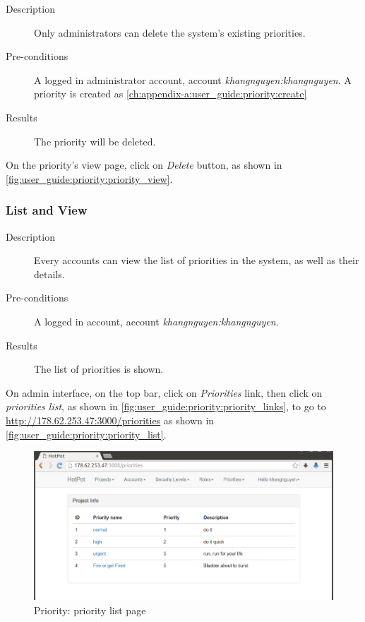 \begin{description}
\item[Description] Only administrators can delete the system's existing priorities.
\item[Pre-conditions] A logged in administrator account, \eg account \emph{khangnguyen:khangnguyen}.
A priority is created as \autoref{ch:appendix-a:user_guide:priority:create}
\item[Results] The priority will be deleted.
\end{description}

On the priority's view page, click on \emph{Delete} button, as shown in \autoref{fig:user_guide:priority:priority_view}.

\subsubsection{List and View}
\label{ch:appendix-a:user_guide:priority:list}

\begin{description}
\item[Description] Every accounts can view the list of priorities in the system, as well as their details.
\item[Pre-conditions] A logged in account, \eg account \emph{khangnguyen:khangnguyen}.
\item[Results] The list of priorities is shown.
\end{description}

On admin interface, on the top bar, click on \emph{Priorities} link, then click on \emph{priorities list}, as shown in \autoref{fig:user_guide:priority:priority_links}, 
to go to \href{http://178.62.253.47:3000/priorities}{http://178.62.253.47:3000/priorities} as shown in \autoref{fig:user_guide:priority:priority_list}.

\begin{figure}[bth]
\myfloatalign
\includegraphics[width=1.0\linewidth]{gfx/chapter_5/priority/priority_list}
\caption[Priority: priority list page]{Priority: priority list page}
\label{fig:user_guide:priority:priority_list}
\end{figure}
